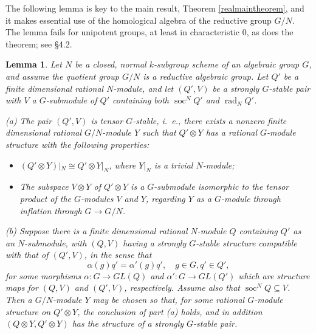 \documentclass[11pt,leqno,amscd,amssymb,verbatim, url]{amsart}
\newtheorem{lem}[thm]{Lemma}
\theoremstyle{definition}
\numberwithin{equation}{thm}
\newcommand{\soc}{\operatorname{soc}}
\newcommand{\rad}{\operatorname{rad}}
\begin{document}
The following lemma is key to the  main result, Theorem \ref{realmaintheorem}, and it makes essential use of the homological algebra
of the reductive group $G/N$. The lemma fails for unipotent groups, at least in characteristic 0, as does the theorem; see \S4.2.

\begin{lem}\label{specialcase} Let $N$ be a closed, normal $k$-subgroup scheme of an algebraic group $G$, and assume the quotient group $G/N$ is a reductive algebraic group. Let $Q'$ be a finite dimensional rational $N$-module,
 and let $(Q',V)$ be a strongly $G$-stable pair with $V$ a $G$-submodule of $Q'$
containing both $\soc^NQ'$ and $\rad_NQ'$. 

(a) The pair $(Q',V)$ is tensor $G$-stable, i.~e., there exists a nonzero finite dimensional rational $G/N$-module $Y$ such that $Q'\otimes Y$
has a rational $G$-module structure
with the following properties:

\begin{itemize}
\item[(1)] $(Q'\otimes Y)|_N\cong Q'\otimes Y|_N$, where $Y|_N$ is a trivial $N$-module;

\item[(2)] The subspace $V\otimes Y$ of $Q'\otimes Y$ is a $G$-submodule isomorphic to the tensor product
of the $G$-modules $V$ and $Y$, regarding $Y$ as a $G$-module through inflation through $G\to G/N$.
\end{itemize}
\medskip
(b) Suppose there is a finite dimensional rational $N$-module $Q$ containing $Q'$ as an $N$-submodule, with $(Q,V)$ having a strongly $G$-stable
structure compatible with that of $(Q',V)$, in the sense that 
\begin{equation}\label{COM}\alpha(g)q'=\alpha'(g)q',\quad g\in G, q'\in Q',\end{equation}
for some morphisms $\alpha:G\to GL(Q)$ and $\alpha':G\to GL(Q')$ which are structure maps for $(Q,V)$ and $(Q',V)$,
respectively. Assume also that $\soc^NQ\subseteq V$.  Then a $G/N$-module $Y$ may be chosen so that,
for some rational $G$-module structure on $Q'\otimes Y$, the conclusion of part (a) holds, and
in addition $(Q\otimes Y,Q'\otimes Y)$ has the structure of a strongly $G$-stable pair. \end{lem}
\end{document}
